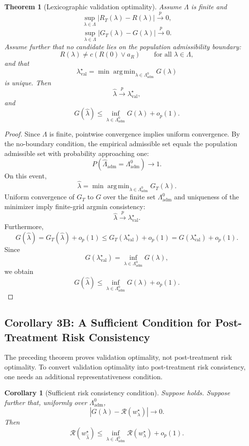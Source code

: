 \documentclass[11pt]{article}
\theoremstyle{plain}
\newtheorem{theorem}{Theorem}[section]
\newtheorem{corollary}[corollary]{Corollary}
\theoremstyle{definition}
\theoremstyle{remark}
\DeclareMathOperator*{\argmin}{arg\,min}
\newcommand{\1}{\mathbbm{1}}
\newcommand{\val}{\mathrm{val}}
\newcommand{\adm}{\mathrm{adm}}
\newcommand{\pto}{\xrightarrow{p}}
\begin{document}
\begin{theorem}[Lexicographic validation optimality]
\label{thm:validation}
Assume \(\Lambda\) is finite and
\[
\sup_{\lambda\in\Lambda}
|R_T(\lambda)-R(\lambda)|
\pto0,
\]
\[
\sup_{\lambda\in\Lambda}
|G_T(\lambda)-G(\lambda)|
\pto0.
\]
Assume further that no candidate lies on the population admissibility boundary:
\[
R(\lambda)
\neq
c\left(R(0)\vee a_R\right)
\qquad
\text{for all }\lambda\in\Lambda,
\]
and that
\[
\lambda_{\val}^{\star}
=
\min
\argmin_{\lambda\in\Lambda_{\adm}^0}
G(\lambda)
\]
is unique. Then
\[
\widehat\lambda \pto \lambda_{\val}^{\star},
\]
and
\[
G(\widehat\lambda)
\le
\inf_{\lambda\in\Lambda_{\adm}^0}G(\lambda)
+
o_p(1).
\]
\end{theorem}

\begin{proof}
Since \(\Lambda\) is finite, pointwise convergence implies uniform convergence.
By the no-boundary condition, the empirical admissible set equals the population
admissible set with probability approaching one:
\[
P(\widehat\Lambda_{\adm}=\Lambda_{\adm}^0)\to1.
\]
On this event,
\[
\widehat\lambda
=
\min
\argmin_{\lambda\in\Lambda_{\adm}^0}
G_T(\lambda).
\]
Uniform convergence of \(G_T\) to \(G\) over the finite set
\(\Lambda_{\adm}^0\) and uniqueness of the minimizer imply finite-grid argmin
consistency:
\[
\widehat\lambda \pto \lambda_{\val}^{\star}.
\]
Furthermore,
\[
G(\widehat\lambda)
=
G_T(\widehat\lambda)+o_p(1)
\le
G_T(\lambda_{\val}^{\star})+o_p(1)
=
G(\lambda_{\val}^{\star})+o_p(1).
\]
Since
\[
G(\lambda_{\val}^{\star})
=
\inf_{\lambda\in\Lambda_{\adm}^0}G(\lambda),
\]
we obtain
\[
G(\widehat\lambda)
\le
\inf_{\lambda\in\Lambda_{\adm}^0}G(\lambda)+o_p(1).
\]
\end{proof}

\subsection{Corollary 3B: A Sufficient Condition for Post-Treatment Risk Consistency}

The preceding theorem proves validation optimality, not post-treatment risk
optimality. To convert validation optimality into post-treatment risk
consistency, one needs an additional representativeness condition.

\begin{corollary}[Sufficient risk consistency condition]
\label{cor:risk-consistency}
Suppose  holds. Suppose further that, uniformly over
\(\Lambda_{\adm}^0\),
\[
\left|
G(\lambda)-\mathcal R(w_\lambda^\star)
\right|
\to0.
\]
Then
\[
\mathcal R(w_{\widehat\lambda}^\star)
\le
\inf_{\lambda\in\Lambda_{\adm}^0}
\mathcal R(w_\lambda^\star)
+
o_p(1).
\]
\end{corollary}
\end{document}
